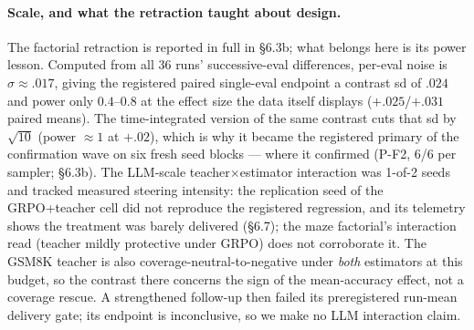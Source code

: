 \paragraph{Scale, and what the retraction taught about design.} The
factorial retraction is reported in full in \S 6.3b; what belongs here
is its power lesson. Computed from all 36 runs' successive-eval
differences, per-eval noise is $\sigma \approx .017$, giving the
registered paired single-eval endpoint a contrast sd of $.024$ and
power only $0.4$--$0.8$ at the effect size the data itself displays
($+.025$/$+.031$ paired means). The time-integrated version of the
same contrast cuts that sd by $\sqrt{10}$ (power ${\approx}1$ at
$+.02$), which is why it became the registered primary of the
confirmation wave on six fresh seed blocks --- where it confirmed
(P-F2, 6/6 per sampler; \S 6.3b). The
LLM-scale teacher$\times$estimator interaction
was 1-of-2 seeds and tracked measured steering intensity: the replication seed of
the GRPO+teacher cell did not reproduce the registered regression, and
its telemetry shows the treatment was barely delivered (\S 6.7); the
maze factorial's interaction read (teacher mildly protective under
GRPO) does not corroborate it. The
GSM8K teacher is also coverage-neutral-to-negative under \emph{both}
estimators at this budget, so the contrast there concerns the sign of
the mean-accuracy effect, not a coverage rescue. A strengthened follow-up
then failed its preregistered run-mean delivery gate; its endpoint is
inconclusive, so we make no LLM interaction claim.


